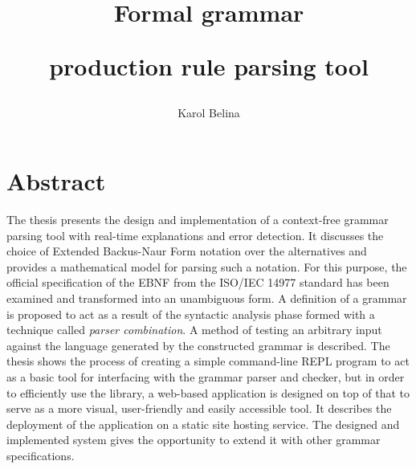 \documentclass[english,engineering]{wizthesis}
\author{Karol Belina}
\title{Formal grammar\par production rule parsing tool}
\begin{document}
\frontmatter %

\maketitle

\chapter*{Abstract}

The thesis presents the design and implementation of a context-free grammar
parsing tool with real-time explanations and error detection. It discusses the
choice of Extended Backus-Naur Form notation over the alternatives and provides
a mathematical model for parsing such a notation. For this purpose, the official
specification of the EBNF from the ISO/IEC 14977 standard has been examined and
transformed into an unambiguous form. A definition of a grammar is proposed to
act as a result of the syntactic analysis phase formed with a technique called
\emph{parser combination}. A method of testing an arbitrary input against the
language generated by the constructed grammar is described. The thesis shows the
process of creating a simple command-line REPL program to act as a basic tool
for interfacing with the grammar parser and checker, but in order to efficiently
use the library, a web-based application is designed on top of that to serve as
a more visual, user-friendly and easily accessible tool. It describes the
deployment of the application on a static site hosting service. The designed and
implemented system gives the opportunity to extend it with other grammar
specifications.
\end{document}
